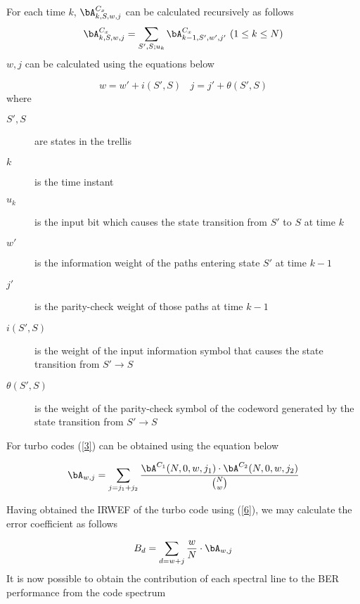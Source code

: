 \documentclass[11pt, oneside, dvipdfmx]{book}
\begin{document}
For each time $k$, $\bA^{C_x}_{k,S,w,j} $ can be calculated recursively as follows\begin{equation}
\bA^{C_x}_{k,S,w,j} =\sum_{S',S;u_k} \bA^{C_x}_{k-1,S',w',j'} ~(1 \leq k \leq N)
\end{equation}
$w,j$ can be calculated using the equations below

\begin{equation}
w=w' +i(S',S)~~~~j=j'+\theta(S',S)
\end{equation}
where

\begin{description}
\item[$S',S$] are states in the trellis

\item[$k$] is the time instant

\item[$u_k$] is the input bit which causes the state transition from $S'$ to $S$ at time $k$

\item[$w'$] is the information weight of the paths entering state $S'$ at time $k-1$

\item[$j'$] is the parity-check weight of those paths at time $k-1$

\item[$i(S',S)$] is the weight of the input information symbol that causes the state transition from $S' \rightarrow S$

\item[$\theta(S',S)$] is the weight of the parity-check symbol of the codeword generated by the state transition from $S' \rightarrow S$
\end{description}

For turbo codes (\ref{3}) can be obtained using the equation below

\begin{equation}
\bA_{w,j} =\sum_{j=j_1+j_2} \frac{\bA^{C_1}(N,0,w,j_1) \cdot \bA^{C_2}(N,0,w,j_2)}{\binom{N}{w}}
\label{6}
\end{equation}

Having obtained the IRWEF of the turbo code using (\ref{6}), we may calculate the error coefficient as follows 

\begin{equation}
B_d =\sum_{d=w+j} \frac{w}{N}\cdot \bA_{w,j}
\label{7}
\end{equation}
 It is now possible to obtain the contribution of each spectral line to the BER performance from the code spectrum
 
\end{document}
